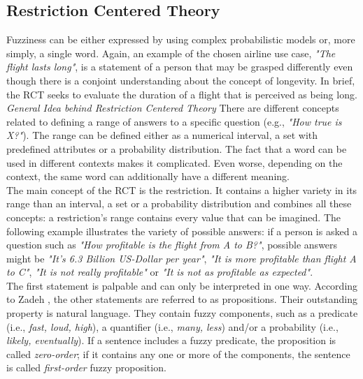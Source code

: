 \documentclass[conference]{IEEEtran}
\begin{document}
\subsection{Restriction Centered Theory}
\label{subsec:rct}
Fuzziness can be either expressed by using complex probabilistic models or, more simply, a single word. Again, an example of the chosen airline use case, \emph{"The flight lasts long"}, is a statement of a person that may be grasped differently even though there is a conjoint understanding about the concept of longevity. In brief, the RCT seeks to evaluate the duration of a flight that is perceived as being long.
\vspace{2mm}
\newline
\emph{General Idea behind  Restriction Centered Theory}
\vspace{1mm}
\newline
There are different concepts related to defining a range of answers to a specific question (e.g., \emph{"How true is X?"}). The range can be defined either as a numerical interval, a set with predefined attributes or a probability distribution. The fact that a word can be used in different contexts makes it complicated. Even worse, depending on the context, the same word can additionally have a different meaning. \\
The main concept of the RCT is the restriction. It contains a higher variety in its range than an interval, a set or a probability distribution and combines all these concepts: a restriction's range contains every value that can be imagined. The following example illustrates the variety of possible answers: if a person is asked a question such as \emph{"How profitable is the flight from A to B?"}, possible answers might be \emph{"It's 6.3 Billion US-Dollar per year"}, \emph{"It is more profitable than flight A to C"}, \emph{"It is not really profitable"} or \emph{"It is not as profitable as expected"}.\\
The first statement is palpable and can only be interpreted in one way. According to Zadeh \cite{zadeh2013}, the other statements are referred to as propositions. Their outstanding property is natural language. They contain fuzzy components, such as a predicate (i.e., \emph{fast, loud, high}), a quantifier (i.e., \emph{many, less}) and/or a probability (i.e., \emph{likely, eventually}). If a sentence includes a fuzzy predicate, the proposition is called \emph{zero-order}; if it contains any one or more of the components, the sentence is called \emph{first-order} fuzzy proposition.\\ 
\end{document}
